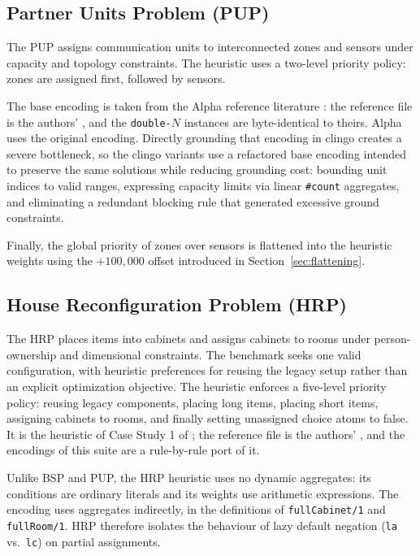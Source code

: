 \subsection{Partner Units Problem (PUP)}
\label{sec:pup-encoding}

The PUP \cite{aschinger2011pup} assigns communication units to interconnected zones and sensors under capacity and topology constraints. The heuristic uses a two-level priority policy: zones are assigned first, followed by sensors.

The base encoding is taken from the Alpha reference literature \cite{aschinger2011pup,comploi2023dynamicAggregates}: the reference file is the authors' , and the \texttt{double-$N$} instances are byte-identical to theirs. Alpha uses the original encoding. Directly grounding that encoding in clingo creates a severe bottleneck, so the clingo variants use a refactored base encoding intended to preserve the same solutions while reducing grounding cost: bounding unit indices to valid ranges, expressing capacity limits via linear \texttt{\#count} aggregates, and eliminating a redundant blocking rule that generated excessive ground constraints.

Finally, the global priority of zones over sensors is flattened into the heuristic weights using the $+100{,}000$ offset introduced in Section~\ref{sec:flattening}.


\subsection{House Reconfiguration Problem (HRP)}
\label{sec:hrp-encoding}

The HRP \cite{friedrich2011reconfiguration} places items into cabinets and assigns cabinets to rooms under person-ownership and dimensional constraints. The benchmark seeks one valid configuration, with heuristic preferences for reusing the legacy setup rather than an explicit optimization objective. The heuristic enforces a five-level priority policy: reusing legacy components, placing long items, placing short items, assigning cabinets to rooms, and finally setting unassigned choice atoms to false. It is the heuristic of Case Study 1 of \cite{comploi2023domain}; the reference file is the authors' , and the encodings of this suite are a rule-by-rule port of it.

Unlike BSP and PUP, the HRP heuristic uses no dynamic aggregates: its conditions are ordinary literals and its weights use arithmetic expressions. The encoding uses aggregates indirectly, in the definitions of \texttt{fullCabinet/1} and \texttt{fullRoom/1}. HRP therefore isolates the behaviour of lazy default negation (\texttt{la} vs.\ \texttt{lc}) on partial assignments.

